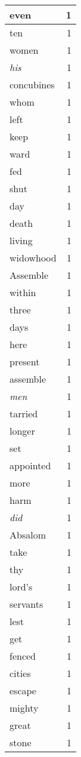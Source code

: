\begin{center}
\begin{longtable}{l|r}
even & 1 \\ \hline
ten & 1 \\ \hline
women & 1 \\ \hline
\emph{his} & 1 \\ \hline
concubines & 1 \\ \hline
whom & 1 \\ \hline
left & 1 \\ \hline
keep & 1 \\ \hline
ward & 1 \\ \hline
fed & 1 \\ \hline
shut & 1 \\ \hline
day & 1 \\ \hline
death & 1 \\ \hline
living & 1 \\ \hline
widowhood & 1 \\ \hline
Assemble & 1 \\ \hline
within & 1 \\ \hline
three & 1 \\ \hline
days & 1 \\ \hline
here & 1 \\ \hline
present & 1 \\ \hline
assemble & 1 \\ \hline
\emph{men} & 1 \\ \hline
tarried & 1 \\ \hline
longer & 1 \\ \hline
set & 1 \\ \hline
appointed & 1 \\ \hline
more & 1 \\ \hline
harm & 1 \\ \hline
\emph{did} & 1 \\ \hline
Absalom & 1 \\ \hline
take & 1 \\ \hline
thy & 1 \\ \hline
lord's & 1 \\ \hline
servants & 1 \\ \hline
lest & 1 \\ \hline
get & 1 \\ \hline
fenced & 1 \\ \hline
cities & 1 \\ \hline
escape & 1 \\ \hline
mighty & 1 \\ \hline
great & 1 \\ \hline
stone & 1 \\ \hline

\end{longtable}
\end{center}
